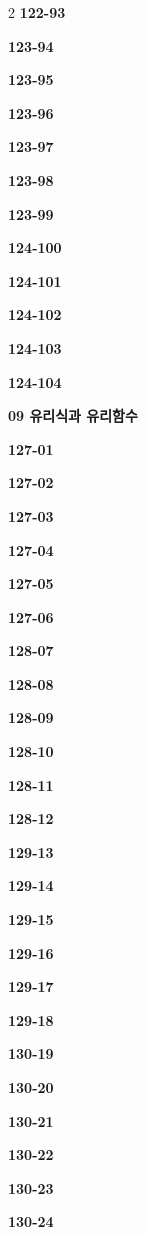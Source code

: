 \documentclass[10pt,a4paper]{article}
\begin{document}
\begin{multicols}{2}
\noindent\textbf{122-93}\ \par
\noindent\textbf{123-94}\ \par
\noindent\textbf{123-95}\ \par
\noindent\textbf{123-96}\ \par
\noindent\textbf{123-97}\ \par
\noindent\textbf{123-98}\ \par
\noindent\textbf{123-99}\ \par
\noindent\textbf{124-100}\ \par
\noindent\textbf{124-101}\ \par
\noindent\textbf{124-102}\ \par
\noindent\textbf{124-103}\ \par
\noindent\textbf{124-104}\ \par
\noindent\textbf{09 유리식과 유리함수}\par\smallskip
\noindent\textbf{127-01}\ \par
\noindent\textbf{127-02}\ \par
\noindent\textbf{127-03}\ \par
\noindent\textbf{127-04}\ \par
\noindent\textbf{127-05}\ \par
\noindent\textbf{127-06}\ \par
\noindent\textbf{128-07}\ \par
\noindent\textbf{128-08}\ \par
\noindent\textbf{128-09}\ \par
\noindent\textbf{128-10}\ \par
\noindent\textbf{128-11}\ \par
\noindent\textbf{128-12}\ \par
\noindent\textbf{129-13}\ \par
\noindent\textbf{129-14}\ \par
\noindent\textbf{129-15}\ \par
\noindent\textbf{129-16}\ \par
\noindent\textbf{129-17}\ \par
\noindent\textbf{129-18}\ \par
\noindent\textbf{130-19}\ \par
\noindent\textbf{130-20}\ \par
\noindent\textbf{130-21}\ \par
\noindent\textbf{130-22}\ \par
\noindent\textbf{130-23}\ \par
\noindent\textbf{130-24}\ \par

\end{multicols}
\end{document}
